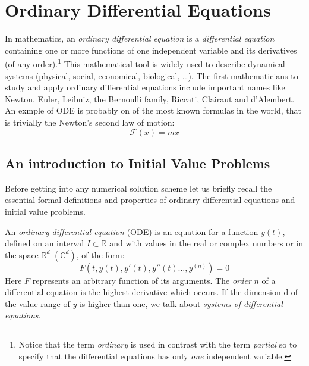 %
%

\chapter{Ordinary Differential Equations}
\label{ODEs}
In mathematics, an \textit{ordinary differential equation} is a \textit{differential equation} containing one or more functions of one independent variable and its derivatives (of any order).\footnote{Notice that the term \textit{ordinary} is used in contrast with the term \textit{partial} so to specify that the differential equations has only \textit{one} independent variable.} This mathematical tool is widely used to describe dynamical systems (physical, social, economical, biological, \dots). The first mathematicians to study and apply ordinary differential equations include important names like Newton, Euler, Leibniz, the Bernoulli family, Riccati, Clairaut and d'Alembert. An exmple of ODE is probably on of the most known formulas in the world, that is trivially the Newton's second law of motion:
\begin{equation}
\mathcal{F}(x)=m\ddot{x}
\end{equation}

\section{An introduction to Initial Value Problems}
Before getting into any numerical solution scheme let us briefly recall the essential formal definitions and properties of ordinary differential equations and initial value problems.

\begin{definition}
	An \textit{ordinary differential equation} (ODE) is an equation for a function $y(t)$, defined on an interval $I \subset \mathbb{R}$ and with values in the real or complex numbers or in the space $\mathbb{R}^d$ $(\mathbb{C}^d)$, of the form:
	\begin{equation}
		F\left(t,y(t),y'(t),y''(t)\dots,y^{(n)}\right) = 0
	\end{equation}
	Here $F$ represents an arbitrary function of its arguments. The \textit{order} $n$ of a differential equation is the highest derivative which occurs. If the dimension d of the value range of $y$ is higher than one, we talk about	\textit{systems of differential equations}.
\end{definition}

